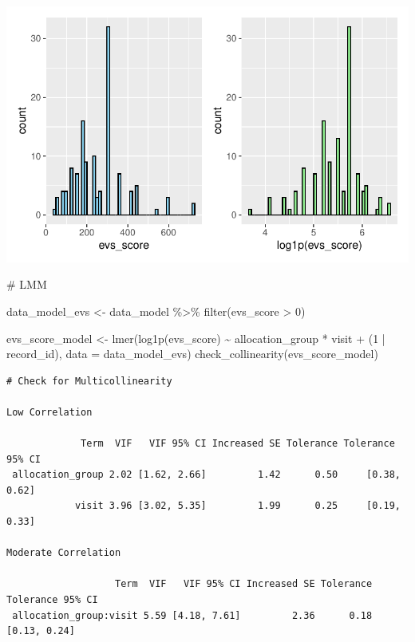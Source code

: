 \documentclass[
  12pt,
]{article}
\newenvironment{Shaded}{\begin{snugshade}}{\end{snugshade}}
\newcommand{\AttributeTok}[1]{\textcolor[rgb]{0.40,0.45,0.13}{#1}}
\newcommand{\CommentTok}[1]{\textcolor[rgb]{0.37,0.37,0.37}{#1}}
\newcommand{\DecValTok}[1]{\textcolor[rgb]{0.68,0.00,0.00}{#1}}
\newcommand{\FunctionTok}[1]{\textcolor[rgb]{0.28,0.35,0.67}{#1}}
\newcommand{\NormalTok}[1]{\textcolor[rgb]{0.00,0.23,0.31}{#1}}
\newcommand{\OtherTok}[1]{\textcolor[rgb]{0.00,0.23,0.31}{#1}}
\newcommand{\SpecialCharTok}[1]{\textcolor[rgb]{0.37,0.37,0.37}{#1}}
\begin{document}
\includegraphics{Outcomes_files/figure-pdf/evs_score_1-1.pdf}

\begin{Shaded}
\begin{Highlighting}[]
\CommentTok{\# LMM}

\NormalTok{data\_model\_evs }\OtherTok{\textless{}{-}}\NormalTok{ data\_model }\SpecialCharTok{\%\textgreater{}\%}
  \FunctionTok{filter}\NormalTok{(evs\_score }\SpecialCharTok{\textgreater{}} \DecValTok{0}\NormalTok{)}

\NormalTok{evs\_score\_model }\OtherTok{\textless{}{-}} \FunctionTok{lmer}\NormalTok{(}\FunctionTok{log1p}\NormalTok{(evs\_score) }\SpecialCharTok{\textasciitilde{}}\NormalTok{ allocation\_group }\SpecialCharTok{*}\NormalTok{ visit }\SpecialCharTok{+} 
\NormalTok{(}\DecValTok{1} \SpecialCharTok{|}\NormalTok{ record\_id), }\AttributeTok{data =}\NormalTok{ data\_model\_evs)}
\FunctionTok{check\_collinearity}\NormalTok{(evs\_score\_model)}
\end{Highlighting}
\end{Shaded}

\begin{verbatim}
# Check for Multicollinearity

Low Correlation

             Term  VIF   VIF 95% CI Increased SE Tolerance Tolerance 95% CI
 allocation_group 2.02 [1.62, 2.66]         1.42      0.50     [0.38, 0.62]
            visit 3.96 [3.02, 5.35]         1.99      0.25     [0.19, 0.33]

Moderate Correlation

                   Term  VIF   VIF 95% CI Increased SE Tolerance Tolerance 95% CI
 allocation_group:visit 5.59 [4.18, 7.61]         2.36      0.18     [0.13, 0.24]
\end{verbatim}
\end{document}
